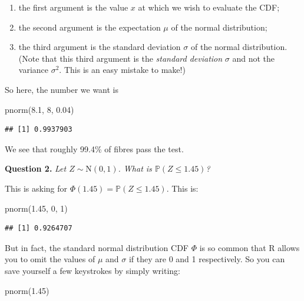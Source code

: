 \documentclass[
  a4paper,
]{book}
\newenvironment{Shaded}{\begin{snugshade}}{\end{snugshade}}
\newcommand{\DecValTok}[1]{\textcolor[rgb]{0.00,0.00,0.81}{#1}}
\newcommand{\FloatTok}[1]{\textcolor[rgb]{0.00,0.00,0.81}{#1}}
\newcommand{\FunctionTok}[1]{\textcolor[rgb]{0.00,0.00,0.00}{#1}}
\newcommand{\NormalTok}[1]{#1}
\providecommand{\tightlist}{%
  \setlength{\itemsep}{0pt}\setlength{\parskip}{0pt}}
\theoremstyle{definition}
\theoremstyle{definition}
\theoremstyle{definition}
\theoremstyle{definition}
\theoremstyle{remark}
\begin{document}
\begin{enumerate}
\def\labelenumi{\arabic{enumi}.}
\tightlist
\item
  the first argument is the value \(x\) at which we wish to evaluate the CDF;
\item
  the second argument is the expectation \(\mu\) of the normal distribution;
\item
  the third argument is the standard deviation \(\sigma\) of the normal distribution. (Note that this third argument is the \emph{standard deviation} \(\sigma\) and not the variance \(\sigma^2\). This is an easy mistake to make!)
\end{enumerate}

So here, the number we want is

\begin{Shaded}
\begin{Highlighting}[]
\FunctionTok{pnorm}\NormalTok{(}\FloatTok{8.1}\NormalTok{, }\DecValTok{8}\NormalTok{, }\FloatTok{0.04}\NormalTok{)}
\end{Highlighting}
\end{Shaded}

\begin{verbatim}
## [1] 0.9937903
\end{verbatim}

We see that roughly 99.4\% of fibres pass the test.

\textbf{Question 2.} \emph{Let \(Z \sim \mathrm{N}(0,1)\). What is \(\mathbb P(Z \leq 1.45)\)?}

This is asking for \(\Phi(1.45) = \mathbb P(Z \leq 1.45)\). This is:

\begin{Shaded}
\begin{Highlighting}[]
\FunctionTok{pnorm}\NormalTok{(}\FloatTok{1.45}\NormalTok{, }\DecValTok{0}\NormalTok{, }\DecValTok{1}\NormalTok{)}
\end{Highlighting}
\end{Shaded}

\begin{verbatim}
## [1] 0.9264707
\end{verbatim}

But in fact, the standard normal distribution CDF \(\Phi\) is so common that R allows you to omit the values of \(\mu\) and \(\sigma\) if they are 0 and 1 respectively. So you can save yourself a few keystrokes by simply writing:

\begin{Shaded}
\begin{Highlighting}[]
\FunctionTok{pnorm}\NormalTok{(}\FloatTok{1.45}\NormalTok{)}
\end{Highlighting}
\end{Shaded}
\end{document}
